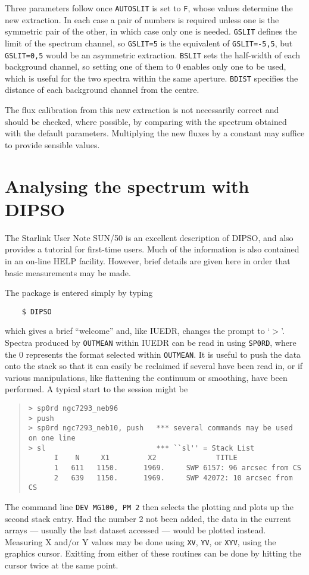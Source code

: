Three parameters follow once {\tt AUTOSLIT} is set to {\tt F}, 
whose values determine the new extraction. In each case
a pair of numbers is required unless one is the symmetric pair of the other, 
in which case only one is needed. {\tt GSLIT} defines the limit of the spectrum
channel, so {\tt GSLIT=5} is the equivalent of {\tt GSLIT=-5,5}, but
{\tt GSLIT=0,5} would be an asymmetric extraction.
{\tt BSLIT} sets the half-width of 
each background channel, so setting one of them to 0 enables only one to be
used, which is useful for the two spectra within the same aperture. {\tt BDIST}
specifies the distance of each background channel from the centre.

The flux calibration from this new extraction is not necessarily correct
and should be checked, where possible, by comparing with the spectrum 
obtained with the default parameters. Multiplying the new fluxes by a 
constant may suffice to provide sensible values. 

\section{Analysing the spectrum with DIPSO}

The Starlink User Note SUN/50 is an excellent description of DIPSO, 
and also provides a tutorial for first-time users. Much of the information 
is also contained in an on-line HELP facility. However, brief details are 
given here in order that basic measurements may be made. 

The package is entered simply by typing 
\begin{verbatim}
    $ DIPSO
\end{verbatim}
which gives a brief ``welcome'' and, like IUEDR, changes the prompt to `$>$'. 
Spectra produced by {\tt OUTMEAN} within IUEDR can be read in using 
{\tt SP0RD}, where the 0 represents the format selected within {\tt OUTMEAN}. 
It is useful to push the data onto the stack so that it can easily be
reclaimed if several have been read in, or if various manipulations, like
flattening the continuum or smoothing, have been performed. A typical start
to the session might be 
\begin{quote}
\begin{verbatim}
> sp0rd ngc7293_neb96
> push                           
> sp0rd ngc7293_neb10, push   *** several commands may be used on one line
> sl                          *** ``sl'' = Stack List
      I    N     X1         X2              TITLE
      1   611   1150.      1969.     SWP 6157: 96 arcsec from CS
      2   639   1150.      1969.     SWP 42072: 10 arcsec from CS
\end{verbatim}
\end{quote}
The command line {\tt DEV MG100, PM 2} then selects the plotting and plots
up the second stack entry. Had the number 2 not been added, the data in the
current arrays --- usually the last dataset accessed --- would be plotted 
instead. Measuring X and/or Y values may be done using {\tt XV}, {\tt YV},
or {\tt XYV}, using the graphics cursor. Exitting from either of these routines
can be done by hitting the cursor twice at the same point. 

